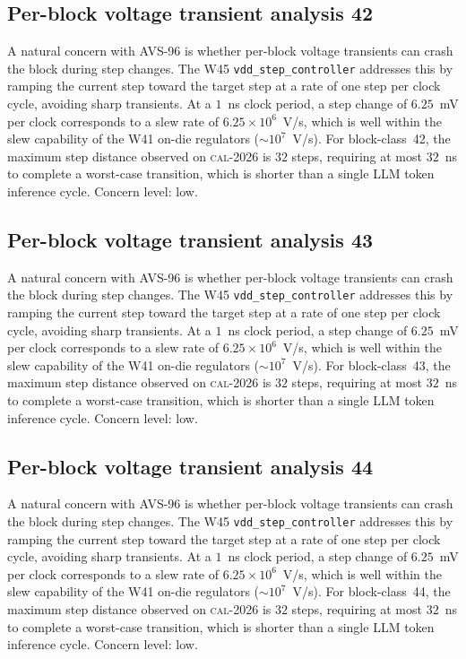 \subsection{Per-block voltage transient analysis 42}

A natural concern with AVS-96 is whether per-block voltage transients
can crash the block during step changes. The W45 \texttt{vdd\_step\_controller} addresses this by ramping the current
step toward the target step at a rate of one step per clock cycle,
avoiding sharp transients. At a $1$~ns clock period, a step change of
$6.25$~mV per clock corresponds to a slew rate of $6.25\times 10^6$~V/s,
which is well within the slew capability of the W41 on-die regulators
($\sim 10^7$~V/s). For block-class~42, the maximum step distance
observed on \textsc{cal-2026} is $32$ steps, requiring at most $32$~ns
to complete a worst-case transition, which is shorter than a single
LLM token inference cycle. Concern level: low.


\subsection{Per-block voltage transient analysis 43}

A natural concern with AVS-96 is whether per-block voltage transients
can crash the block during step changes. The W45 \texttt{vdd\_step\_controller} addresses this by ramping the current
step toward the target step at a rate of one step per clock cycle,
avoiding sharp transients. At a $1$~ns clock period, a step change of
$6.25$~mV per clock corresponds to a slew rate of $6.25\times 10^6$~V/s,
which is well within the slew capability of the W41 on-die regulators
($\sim 10^7$~V/s). For block-class~43, the maximum step distance
observed on \textsc{cal-2026} is $32$ steps, requiring at most $32$~ns
to complete a worst-case transition, which is shorter than a single
LLM token inference cycle. Concern level: low.


\subsection{Per-block voltage transient analysis 44}

A natural concern with AVS-96 is whether per-block voltage transients
can crash the block during step changes. The W45 \texttt{vdd\_step\_controller} addresses this by ramping the current
step toward the target step at a rate of one step per clock cycle,
avoiding sharp transients. At a $1$~ns clock period, a step change of
$6.25$~mV per clock corresponds to a slew rate of $6.25\times 10^6$~V/s,
which is well within the slew capability of the W41 on-die regulators
($\sim 10^7$~V/s). For block-class~44, the maximum step distance
observed on \textsc{cal-2026} is $32$ steps, requiring at most $32$~ns
to complete a worst-case transition, which is shorter than a single
LLM token inference cycle. Concern level: low.


